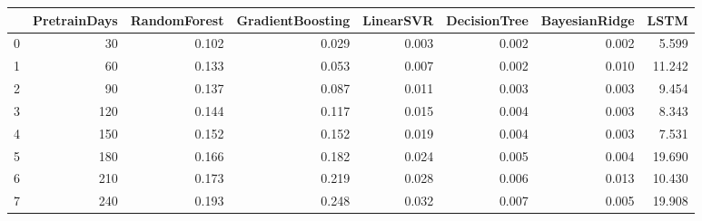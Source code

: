 \begin{tabular}{lrrrrrrr}
\toprule
{} &  PretrainDays &  RandomForest &  GradientBoosting &  LinearSVR &  DecisionTree &  BayesianRidge &   LSTM \\
\midrule
0 &            30 &         0.102 &             0.029 &      0.003 &         0.002 &          0.002 &  5.599 \\
1 &            60 &         0.133 &             0.053 &      0.007 &         0.002 &          0.010 & 11.242 \\
2 &            90 &         0.137 &             0.087 &      0.011 &         0.003 &          0.003 &  9.454 \\
3 &           120 &         0.144 &             0.117 &      0.015 &         0.004 &          0.003 &  8.343 \\
4 &           150 &         0.152 &             0.152 &      0.019 &         0.004 &          0.003 &  7.531 \\
5 &           180 &         0.166 &             0.182 &      0.024 &         0.005 &          0.004 & 19.690 \\
6 &           210 &         0.173 &             0.219 &      0.028 &         0.006 &          0.013 & 10.430 \\
7 &           240 &         0.193 &             0.248 &      0.032 &         0.007 &          0.005 & 19.908 \\
\bottomrule
\end{tabular}
